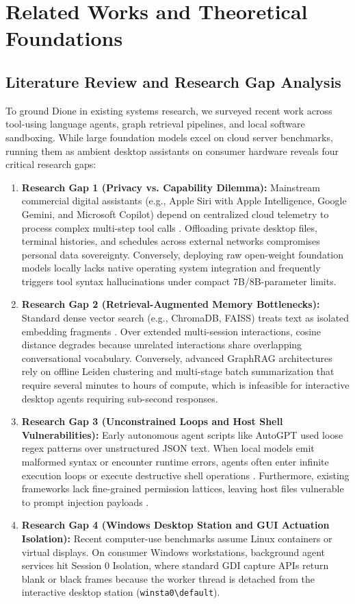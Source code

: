 \documentclass[conference,a4paper]{IEEEtran}
\begin{document}
\section{Related Works and Theoretical Foundations}

\subsection{Literature Review and Research Gap Analysis}
To ground Dione in existing systems research, we surveyed recent work across tool-using language agents, graph retrieval pipelines, and local software sandboxing. While large foundation models excel on cloud server benchmarks, running them as ambient desktop assistants on consumer hardware reveals four critical research gaps:
\begin{enumerate}
    \item \textbf{Research Gap 1 (Privacy vs. Capability Dilemma):} Mainstream commercial digital assistants (e.g., Apple Siri with Apple Intelligence, Google Gemini, and Microsoft Copilot) depend on centralized cloud telemetry to process complex multi-step tool calls \cite{apple2024pcc, google2024geminiprivacy, microsoft2024copilotprivacy}. Offloading private desktop files, terminal histories, and schedules across external networks compromises personal data sovereignty. Conversely, deploying raw open-weight foundation models locally lacks native operating system integration and frequently triggers tool syntax hallucinations under compact 7B/8B-parameter limits.
    \item \textbf{Research Gap 2 (Retrieval-Augmented Memory Bottlenecks):} Standard dense vector search (e.g., ChromaDB, FAISS) treats text as isolated embedding fragments \cite{lewis2020retrieval}. Over extended multi-session interactions, cosine distance degrades because unrelated interactions share overlapping conversational vocabulary. Conversely, advanced GraphRAG architectures \cite{edge2024graphrag} rely on offline Leiden clustering and multi-stage batch summarization that require several minutes to hours of compute, which is infeasible for interactive desktop agents requiring sub-second responses.
    \item \textbf{Research Gap 3 (Unconstrained Loops and Host Shell Vulnerabilities):} Early autonomous agent scripts like AutoGPT \cite{liu2023agentbench} used loose regex patterns over unstructured JSON text. When local models emit malformed syntax or encounter runtime errors, agents often enter infinite execution loops or execute destructive shell operations \cite{ruan2023identifying}. Furthermore, existing frameworks lack fine-grained permission lattices, leaving host files vulnerable to prompt injection payloads \cite{zhang2024agent}.
    \item \textbf{Research Gap 4 (Windows Desktop Station and GUI Actuation Isolation):} Recent computer-use benchmarks assume Linux containers or virtual displays. On consumer Windows workstations, background agent services hit Session 0 Isolation, where standard GDI capture APIs return blank or black frames because the worker thread is detached from the interactive desktop station (\texttt{winsta0\textbackslash default}).
\end{enumerate}
\end{document}
